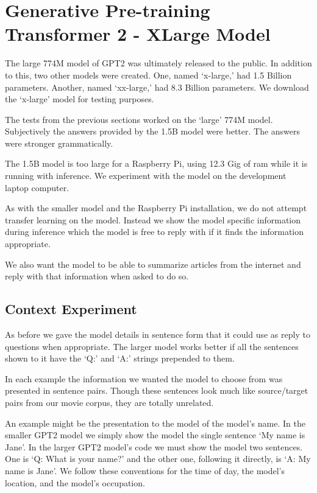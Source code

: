 
\section{Generative Pre-training Transformer 2 - XLarge Model}

The large 774M model of GPT2 was ultimately released to the public. In addition to this, two other models were created. One, named `x-large,' had 1.5 Billion parameters. Another, named `xx-large,' had 8.3 Billion parameters. We download the `x-large' model for testing purposes.

The tests from the previous sections worked on the `large' 774M model. Subjectively the answers provided by the 1.5B model were better. The answers were stronger grammatically.

The 1.5B model is too large for a Raspberry Pi, using 12.3 Gig of ram while it is running with inference. We experiment with the model on the development laptop computer.

As with the smaller model and the Raspberry Pi installation, we do not attempt transfer learning on the model. Instead we show the model specific information during inference which the model is free to reply with if it finds the information appropriate.

We also want the model to be able to summarize articles from the internet and reply with that information when asked to do so. 

\label{chapter-gpt2-xl-intro}

\subsection{Context Experiment}

As before we gave the model details in sentence form that it could use as reply to questions when appropriate. The larger model works better if all the sentences shown to it have the `Q:' and `A:' strings prepended to them. 

In each example the information we wanted the model to choose from was presented in sentence pairs. Though these sentences look much like source/target pairs from our movie corpus, they are totally unrelated.

An example might be the presentation to the model of the model's name. In the smaller GPT2 model we simply show the model the single sentence `My name is Jane'. In the larger GPT2 model's code we must show the model two sentences. One is `Q: What is your name?' and the other one, following it directly, is `A: My name is Jane'. We follow these conventions for the time of day, the model's location, and the model's occupation.

